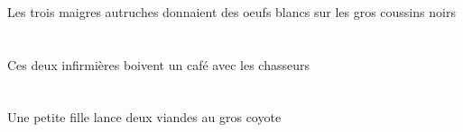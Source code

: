 \begin{exe}
\DEFPlObl{}   \grosBPl{}   \noirBPl{}   \coussinBPlObl{}   \SUR{}   \DEFPlErg{}   \troisBPl{}   \maigreBPl{}   \autrucheBPlErg{}   \INDPlAbs{}   \blancCPl{}   \oeufCPlAbs{}  \donnerVdPstCPl{}\\
\DEFPlOblP{}   \grosBPlP{}   \noirBPlP{}   \coussinBPlOblP{}   \SURP{}   \DEFPlErgP{}   \troisBPlP{}   \maigreBPlP{}   \autrucheBPlErgP{}   \INDPlAbsP{}   \blancCPlP{}   \oeufCPlAbsP{}  \donnerVdPstCPlP{}\\
\DEFPlOblG{}   \grosBPlG{}   \noirBPlG{}   \coussinBPlOblG{}   \SURG{}   \DEFPlErgG{}   \troisBPlG{}   \maigreBPlG{}   \autrucheBPlErgG{}   \INDPlAbsG{}   \blancCPlG{}   \oeufCPlAbsG{}  \donnerVdPstCPlG{}\\
Les trois maigres autruches donnaient des oeufs blancs sur les gros coussins noirs
\ex\glll
\DEFPlObl{}   \chasseurCPlObl{}   \AVEC{}   \DEMDuErg{}   \infirmiereADuErg{}   \INDSgAbs{}   \cafeCSgAbs{}  \boireVtPrsCSg{}\\
\DEFPlOblP{}   \chasseurCPlOblP{}   \AVECP{}   \DEMDuErgP{}   \infirmiereADuErgP{}   \INDSgAbsP{}   \cafeCSgAbsP{}  \boireVtPrsCSgP{}\\
\DEFPlOblG{}   \chasseurCPlOblG{}   \AVECG{}   \DEMDuErgG{}   \infirmiereADuErgG{}   \INDSgAbsG{}   \cafeCSgAbsG{}  \boireVtPrsCSgG{}\\
Ces deux infirmières boivent un café avec les chasseurs
\ex\glll
\INDSgErg{}   \petitCSg{}   \filleCSgErg{}    \DEFSgDat{}   \grosCSg{}   \coyoteCSgDat{}   \INDDuAbs{}   \viandeADuAbs{}  \lancerVdPrsADu{}\\
\INDSgErgP{}   \petitCSgP{}   \filleCSgErgP{}    \DEFSgDatP{}   \grosCSgP{}   \coyoteCSgDatP{}   \INDDuAbsP{}   \viandeADuAbsP{}  \lancerVdPrsADuP{}\\
\INDSgErgG{}   \petitCSgG{}   \filleCSgErgG{}    \DEFSgDatG{}   \grosCSgG{}   \coyoteCSgDatG{}   \INDDuAbsG{}   \viandeADuAbsG{}  \lancerVdPrsADuG{}\\
Une petite fille lance deux viandes au gros coyote
\end{exe}
